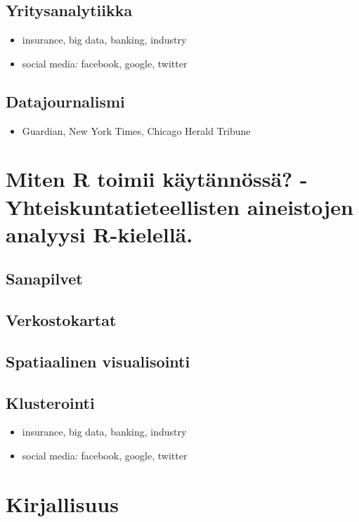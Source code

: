 \subsection{Yritysanalytiikka}\label{yritysanalytiikka}

\begin{itemize}
\itemsep1pt\parskip0pt
\item
  insurance, big data, banking, industry
\item
  social media: facebook, google, twitter
\end{itemize}

\subsection{Datajournalismi}\label{datajournalismi}

\begin{itemize}
\itemsep1pt\parskip0pt
\item
  Guardian, New York Times, Chicago Herald Tribune
\end{itemize}

\section{Miten R toimii käytännössä? - Yhteiskuntatieteellisten
aineistojen analyysi
R-kielellä.}\label{miten-r-toimii-kuxe4ytuxe4nnuxf6ssuxe4---yhteiskuntatieteellisten-aineistojen-analyysi-r-kielelluxe4.}

\subsection{Sanapilvet}\label{sanapilvet}

\subsection{Verkostokartat}\label{verkostokartat}

\subsection{Spatiaalinen
visualisointi}\label{spatiaalinen-visualisointi}

\subsection{Klusterointi}\label{klusterointi}

\begin{itemize}
\itemsep1pt\parskip0pt
\item
  insurance, big data, banking, industry
\item
  social media: facebook, google, twitter
\end{itemize}

\section{Kirjallisuus}\label{kirjallisuus}
